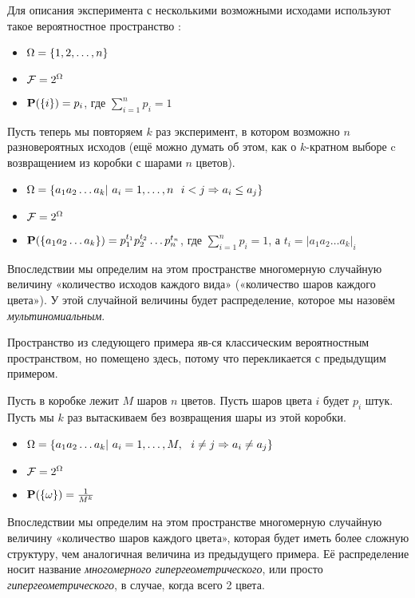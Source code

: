 \begin{example}
	Для описания эксперимента с несколькими возможными исходами используют такое вероятностное пространство \PSP:
	\begin{itemize}
		\item $\Omega = \{1, 2, \ldots, n\}$
		\item $\mathcal{F} = 2^{\Omega}$
		\item $\mathbf{P}(\{i\}) = p_i$, где $\sum_{i=1}^n p_i = 1$
	\end{itemize}
\end{example}

\begin{example}
	Пусть теперь мы повторяем $k$ раз эксперимент, в котором возможно $n$ разновероятных исходов (ещё можно думать об этом, как о $k$-кратном выборе c возвращением из коробки с шарами $n$ цветов).
	\begin{itemize}
		\item $\Omega = \{a_1a_2\ldots a_k |~a_i = 1, \ldots, n~~i < j \Rightarrow a_i \le a_j \}$
		\item $\mathcal{F} = 2^{\Omega}$
		\item $\mathbf{P}(\{a_1a_2\ldots a_k\}) = p_1^{t_1}p_2^{t_2}\ldots p_n^{t_n}$, где $\sum_{i=1}^n p_i = 1$, а $t_i = |a_1a_2\ldots a_k|_i$
	\end{itemize}
	Впоследствии мы определим на этом пространстве многомерную случайную величину «количество исходов каждого вида» («количество шаров каждого цвета»). У этой случайной величины будет распределение, которое мы назовём {\it мультиномиальным}.
\end{example}

Пространство из следующего примера яв-ся классическим вероятностным пространством, но помещено здесь, потому что перекликается с предыдущим примером.

\begin{example}
	Пусть в коробке лежит $M$ шаров $n$ цветов. Пусть шаров цвета $i$ будет $p_i$ штук. Пусть мы $k$ раз вытаскиваем без возвращения шары из этой коробки.
	\begin{itemize}
		\item $\Omega = \{a_1a_2\ldots a_k |~a_i = 1, \ldots, M,~~i \not = j \Rightarrow a_i \not = a_j \}$
		\item $\mathcal{F} = 2^{\Omega}$
		\item $\mathbf{P}(\{\omega\}) = \frac{1}{M^k}$
	\end{itemize}
	Впоследствии мы определим на этом пространстве многомерную случайную величину «количество шаров каждого цвета», которая будет иметь более сложную структуру, чем аналогичная величина из предыдущего примера. Её распределение носит название {\it многомерного гипергеометрического}, или просто {\it гипергеометрического}, в случае, когда всего 2 цвета.
\end{example}

